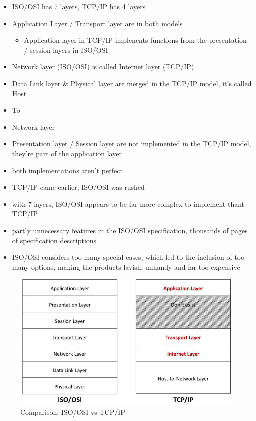 \documentclass[a4paper,12pt]{article}
\begin{document}
 \begin{itemize}[itemsep=0pt]
 	\item  ISO/OSI has 7 layers, TCP/IP has 4 layers
 	\item  Application Layer / Transport layer are in both models
 	\begin{itemize}
 		\item  Application layer in TCP/IP implenents functions from the presentation / session layers in ISO/OSI
 	\end{itemize}
 	\item  Network layer (ISO/OSI) is called Internet layer (TCP/IP)
 	\item  Data Link layer \& Physical layer are merged in the TCP/IP model, it's called Host\item To\item Network layer
 	\item  Presentation layer / Session layer are not implemented in the TCP/IP model, they're part of the application layer
 	\item  both implementations aren't perfect
 	\item  TCP/IP came earlier, ISO/OSI was rushed
 	\item  with 7 layers, ISO/OSI appears to be far more complex to implement thant TCP/IP
 	\item  partly unnecessary features in the ISO/OSI specification, thousands of pages of specification descriptions
 	\item  ISO/OSI considers too many special cases, which led to the inclusion of too many options, making the products lavish, unhandy and far too expensive
 \end{itemize}
  \begin{figure}[h!]
 	\begin{center}
 		\includegraphics[width=0.7\linewidth]{TCP-OSI.png} 
 		\caption{Comparison: ISO/OSI vs TCP/IP}
 	\end{center}
 \end{figure}
 
\end{document}
